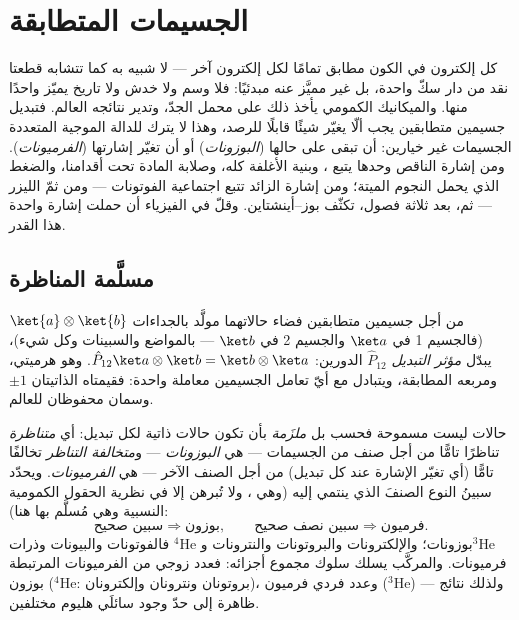 \chapter{الجسيمات المتطابقة}\label{ch:b3:identical-particles}

كل إلكترون في الكون مطابق تمامًا لكل إلكترون
آخر --- لا شبيه به كما تتشابه قطعتا نقد من دار سكّ واحدة، بل
غير مميَّز عنه مبدئيًا: فلا وسم ولا خدش ولا تاريخ يميّز
واحدًا منها. والميكانيك الكمومي يأخذ ذلك على محمل الجدّ، وتدير
نتائجه العالم. فتبديل جسيمين متطابقين يجب ألّا يغيّر شيئًا
قابلًا للرصد، وهذا لا يترك للدالة الموجية المتعددة الجسيمات غير
خيارين: أن تبقى على حالها (\emph{البوزونات}) أو أن تغيّر
إشارتها (\emph{الفرميونات}). ومن إشارة الناقص وحدها يتبع ، وبنية الأغلفة 
كله، وصلابة المادة تحت أقدامنا، والضغط الذي يحمل
النجوم الميتة؛ ومن إشارة الزائد تتبع اجتماعية
الفوتونات --- ومن ثمّ الليزر --- ثم، بعد ثلاثة فصول،
تكثّف بوز--أينشتاين. وقلّ في الفيزياء أن حملت إشارة واحدة
هذا القدر.

\section{مسلَّمة المناظرة}

\begin{definition}[التبديل]\label{def:b3:identical-particles:exchange}
من أجل جسيمين متطابقين فضاء حالاتهما مولَّد بالجداءات
$\ket{a}\otimes\ket{b}$ (فالجسيم 1 في $\ket a$ والجسيم 2 في
$\ket b$ --- بالمواضع والسبينات وكل شيء)، يبدّل \emph{مؤثر التبديل}
$\hat P_{12}$ الدورين: $\hat P_{12}\ket a\otimes\ket b =
\ket b\otimes\ket a$. وهو هرميتي، ومربعه المطابقة، ويتبادل
مع أيّ  تعامل الجسيمين معاملة واحدة:
فقيمتاه الذاتيتان $\pm1$ وسمان محفوظان للعالم.
\end{definition}

\begin{theorem}\label{thm:b3:identical-particles:postulate}
حالات  ليست مسموحة فحسب بل \emph{ملزَمة}
بأن تكون حالات ذاتية لكل تبديل: أي \emph{متناظرة} تناظرًا تامًّا
من أجل صنف من الجسيمات --- هي \emph{البوزونات} ---
و\emph{متخالفة التناظر} تخالفًا تامًّا (أي تغيّر الإشارة عند كل تبديل)
من أجل الصنف الآخر --- هي \emph{الفرميونات}. ويحدّد سبينُ النوع
الصنفَ الذي ينتمي إليه (وهي \emph{}، ولا تُبرهن
إلا في نظرية الحقول الكمومية النسبية وهي مُسلَّم بها هنا):
\[
\text{سبين صحيح} \Rightarrow \text{بوزون} , \qquad
\text{سبين نصف صحيح} \Rightarrow \text{فرميون} .
\]
فالفوتونات والبيونات وذرات $^4$He بوزونات؛ والإلكترونات والبروتونات
والنترونات و$^3$He فرميونات.
والمركَّب يسلك سلوك مجموع أجزائه: فعدد زوجي من
الفرميونات المرتبطة بوزون ($^4$He: بروتونان ونترونان وإلكترونان)، وعدد
فردي فرميون ($^3$He) --- ولذلك نتائج ظاهرة إلى حدّ وجود
سائلَي هليوم مختلفين.
\end{theorem}
\admitted

